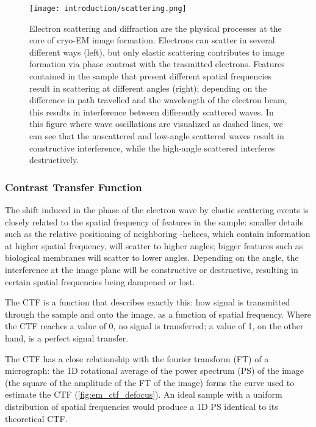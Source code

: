 \begin{figure}[ht]
    \centering
    \texttt{[image: introduction/scattering.png]}
    \caption[Image formation]{Electron scattering and diffraction are the physical processes at the core of cryo-EM image formation. Electrons can scatter in several different ways (left), but only elastic scattering contributes to image formation via phase contrast with the trasmitted electrons. Features contained in the sample that present different spatial frequencies result in scattering at different angles (right); depending on the difference in path travelled and the wavelength of the electron beam, this results in interference between differently scattered waves. In this figure where wave oscillations are visualized as dashed lines, we can see that the unscattered and low-angle scattered waves result in constructive interference, while the high-angle scattered interferes destructively.}
    \label{fig:em_image_formation}
\end{figure}

\subsubsection{Contrast Transfer Function}\label{em_ctf}
The shift induced in the phase of the electron wave by elastic scattering events is closely related to the spatial frequency of features in the sample: smaller details such as the relative positioning of neighboring \alpha-helices, which contain information at higher spatial frequency, will scatter to higher angles; bigger features such as biological membranes will scatter to lower angles.
Depending on the angle, the interference at the image plane will be constructive or destructive, resulting in certain spatial frequencies being dampened or lost.

The CTF is a function that describes exactly this: how signal is transmitted through the sample and onto the image, as a function of spatial frequency.
Where the CTF reaches a value of \num{0}, no signal is transferred; a value of \num{1}, on the other hand, is a perfect signal transfer.

The CTF has a close relationship with the fourier transform (FT) of a micrograph: the 1D rotational average of the power spectrum (PS) of the image (the square of the amplitude of the FT of the image) forms the curve used to estimate the CTF (\autoref{fig:em_ctf_defocus}).
An ideal sample with a uniform distribution of spatial frequencies would produce a 1D PS identical to its theoretical CTF.

